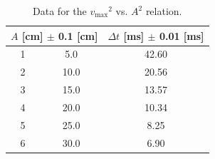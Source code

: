 \begin{table}[H]
	\centering
	\begin{tabular}{|c|c|c|}
	\hline
	\multicolumn{2}{|c|}{ $A$ [cm] $\pm$ 0.1 [cm]} & $\Delta t$ [ms] $\pm$ 0.01 [ms]  \\ \hline
	1  &  5.0 & 42.60 \\ \hline
	2  & 10.0 & 20.56 \\ \hline
	3  & 15.0 & 13.57 \\ \hline
	4  & 20.0 & 10.34 \\ \hline
	5  & 25.0 &  8.25 \\ \hline
	6  & 30.0 &  6.90 \\ \hline
	\end{tabular}
	\caption{Data for the $ {v_{\max}}^2$ vs. $A^2$ relation.}
\label{A_t}
\end{table}



